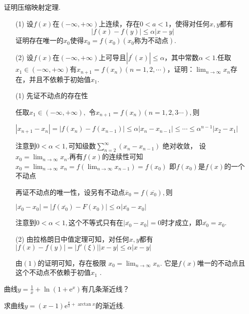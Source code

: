 \begin{xiti}
\begin{solution}
	
\end{solution}
\item 证明压缩映射定理.
\begin{enumerate}
	\item[(1)] 设$f(x)$在$(-\infty,+\infty)$上连续，存在$0<a<1$，使得对任何$x,y$都有
	\[| f ( x ) - f ( y ) | \leqslant \alpha | x - y |\]
	证明存在唯一的$x_{0}$使得$x_{0}=f(x_{0})(x_{0}\text{称为不动点})$.
	\item[(2)] 设$f(x)$在$(-\infty,+\infty)$上可导且$\left| f ^ { \prime } ( x ) \right| \leqslant \alpha$，其中常数$\alpha<1$.任取$x _ { 1 } \in ( - \infty , + \infty )$有$x _ { n + 1 } = f \left( x _ { n } \right) ( n = 1,2 , \cdots )$，证明：$\lim_{ n \rightarrow \infty }x_{n}$存在，并且不依赖于初始值$x_{1}$.
\end{enumerate}
\begin{solution}
	\begin{enumerate}
		\item[(1)] 先证不动点的存在性
		
		任取$x_1\in(-\infty,+\infty),$
		令$x_{n+1}=f(x_n)(n=1,2,3\cdots ),$则
		
		$|x_{n+1}-x_n|=|f(x_n)-f(x_{n-1})| \leq \alpha |x_n-x_{n-1}|\leq \cdots \leq \alpha ^{n-1}|x_2-x_1|$
		
		注意到$0<\alpha<1,$可知级数$ \sum_{n=2}^{\infty}(x_n-x_{n-1})$
		绝对收敛，
		设$x_0=\lim_{n \rightarrow \infty}x_n.$再有$f(x)$的连续性可知
		$x_0=\lim_{n \rightarrow \infty}x_n=f(\lim_{n \rightarrow \infty}x_{n-1})=f(x_0)$
		即$f(x_0)$是$f(x)$的一个不动点
		
		 再证不动点的唯一性，设另有不动点$\overline x_0=f(\overline{x_0}),$则
		
		$|\overline{x_0}-x_0|=|f(\overline{x_0})-F(x_0)|\leq \alpha |\overline{x_0}-x_0|$
		
		注意到$0<\alpha<1,$这个不等式只有在$|\overline{x_0}-x_0|=0$时才成立，即$\overline{x_0}=x_0.$
		\item[(2)] 由拉格朗日中值定理可知，对任何$x,y$都有
		$|f(x)-f(y)|=|f'(\xi)||x-y|\leq \alpha|x-y|$
		
		由$(1)$的证明可知，存在极限
		$x_0=\lim_{n \rightarrow \infty}x_n.$
		它是$f(x)$唯一的不动点且这个不动点不依赖于初值$x_1$
		.
	\end{enumerate}
	
\end{solution}
\item 曲线$y = \frac { 1 } { x } + \ln \left( 1 + \mathrm { e } ^ { x } \right)$有几条渐近线？
\item 求曲线$y = ( x - 1 ) \mathrm { e } ^ { \frac { \pi } { 2 } + \arctan x }$的渐近线.
\end{xiti}



